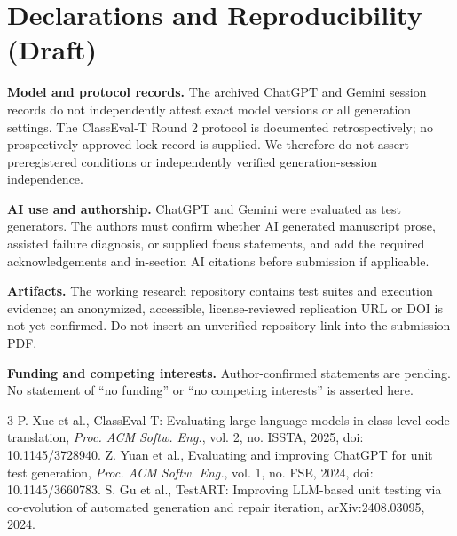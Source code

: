 \documentclass[conference]{IEEEtran}
\begin{document}
\section{Declarations and Reproducibility (Draft)}
\noindent\textbf{Model and protocol records.} The archived ChatGPT and Gemini session records do not independently attest exact model versions or all generation settings. The ClassEval-T Round 2 protocol is documented retrospectively; no prospectively approved lock record is supplied. We therefore do not assert preregistered conditions or independently verified generation-session independence.

\noindent\textbf{AI use and authorship.} ChatGPT and Gemini were evaluated as test generators. The authors must confirm whether AI generated manuscript prose, assisted failure diagnosis, or supplied focus statements, and add the required acknowledgements and in-section AI citations before submission if applicable.

\noindent\textbf{Artifacts.} The working research repository contains test suites and execution evidence; an anonymized, accessible, license-reviewed replication URL or DOI is not yet confirmed. Do not insert an unverified repository link into the submission PDF.

\noindent\textbf{Funding and competing interests.} Author-confirmed statements are pending. No statement of ``no funding'' or ``no competing interests'' is asserted here.

\begin{thebibliography}{3}
 P. Xue et al., ClassEval-T: Evaluating large language models in class-level code translation, \emph{Proc. ACM Softw. Eng.}, vol. 2, no. ISSTA, 2025, doi: 10.1145/3728940.
 Z. Yuan et al., Evaluating and improving ChatGPT for unit test generation, \emph{Proc. ACM Softw. Eng.}, vol. 1, no. FSE, 2024, doi: 10.1145/3660783.
 S. Gu et al., TestART: Improving LLM-based unit testing via co-evolution of automated generation and repair iteration, arXiv:2408.03095, 2024.
\end{thebibliography}
\end{document}

